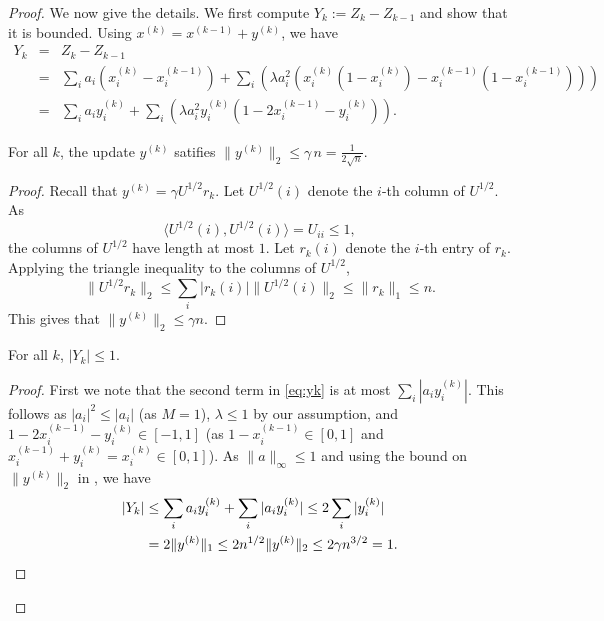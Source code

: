 \documentclass{toc}
\newcommand{\ip}[1]{\langle #1 \rangle}
\begin{document}
\begin{proof}
We now give the details.
We first compute $Y_k := Z_k - Z_{k-1} $ and show that it is bounded. Using
 $x^{(k)} = x^{(k-1)} + y^{(k)}$, we have
\begin{eqnarray}
Y_k & =&  Z_k - Z_{k-1} \nonumber \\
& = & \sum_i a_i (x_i^{(k)} - x_i^{(k-1)}) + \sum_i \left(\lambda a_i^2 ( x_i^{(k)}(1- x_i^{(k)}) - x_i^{(k-1)}(1- x_i^{(k-1)}))   \right) \nonumber \\
&= & \sum_i a_i y_i^{(k)} + \sum_i \left(\lambda a_i^2  y_i^{(k)} (1- 2 x_i^{(k-1)}  -  y_i^{(k)}) \right).
 \label{eq:yk}
\end{eqnarray}
%
\begin{claim}
\label{bound-y}
For all $k$, the update $y^{(k)}$ satifies $\|y^{(k)}\|_2 \leq \gamma\, n = \frac{1}{2\sqrt{n}}$.
\end{claim}
\begin{proof}
Recall that $y^{(k)} = \gamma U^{1/2} r_k$.  
Let $U^{1/2}(i)$ denote the $i$-th column of $U^{1/2}$. As
%
%
\[
\ip{U^{1/2}(i), U^{1/2}(i)} = U_{ii} \leq 1,     %
\]
the columns of $U^{1/2}$
have length at most $1$. 
Let $r_k(i)$ denote the $i$-th entry of $r_k$. Applying the triangle inequality to the columns of $U^{1/2}$,
\[ \|U^{1/2} r_k\|_2 \leq \sum_i |r_k(i) |\|U^{1/2}(i)\|_2  \leq \|r_k\|_1 \leq n.\]
This gives that $\|y^{(k)}\|_2 \leq \gamma n$.
\end{proof}
\begin{claim}
 For all $k$, $|Y_k| \leq 1$.
\end{claim}
\begin{proof}
First we note that the second term in \eqref{eq:yk} is at most $\sum_i |a_i y_i^{(k)}|$.
This follows as $|a_i|^2 \leq |a_i|$ (as $M=1$), $\lambda \leq 1$ by our assumption, and
$1-2x_i^{(k-1)} - y_i^{(k)} \in [-1,1]$ (as $1-x_i^{(k-1)} \in [0,1]$  and
$ x_i^{(k-1)} + y_i^{(k)} = x_i^{(k)} \in [0,1] $). As $\|a\|_\infty\leq 1$ and using the bound on $\|y^{(k)}\|_2$ in , we have 
%
%
\begin{align*}
  |Y_k| & \leq %
                 \sum_i a_i y_i^{(k)} +    \sum_i |a_i y_i^{(k)}|
\leq 2 \sum_i  |y_i^{(k)}| \\
        & = %
              2 \|y^{(k)}\|_1  \leq 2 n^{1/2}
\|y^{(k)}\|_2  \leq 2 \gamma n^{3/2} = 1. \qedhere
\end{align*}
%
\end{proof}


\end{proof}
\end{document}
